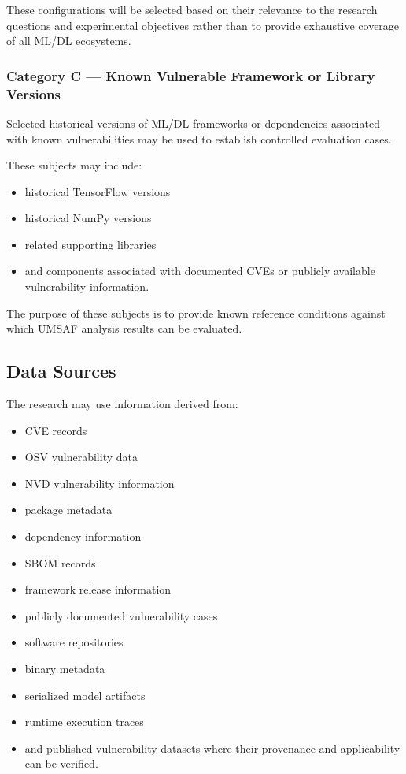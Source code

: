 \documentclass[
  12pt,
  letterpaper,
  oneside]{report}
\providecommand{\tightlist}{%
  \setlength{\itemsep}{0pt}\setlength{\parskip}{0pt}}
\begin{document}
These configurations will be selected based on their relevance to the
research questions and experimental objectives rather than to provide
exhaustive coverage of all ML/DL ecosystems.

\subsubsection{Category C --- Known Vulnerable Framework or Library
Versions}\label{category-c--known-vulnerable-framework-or-library-versions}

Selected historical versions of ML/DL frameworks or dependencies
associated with known vulnerabilities may be used to establish
controlled evaluation cases.

These subjects may include:

\begin{itemize}
\tightlist
\item
  historical TensorFlow versions
\item
  historical NumPy versions
\item
  related supporting libraries
\item
  and components associated with documented CVEs or publicly available
  vulnerability information.
\end{itemize}

The purpose of these subjects is to provide known reference conditions
against which UMSAF analysis results can be evaluated.

\subsection{Data Sources}\label{1132-data-sources}

The research may use information derived from:

\begin{itemize}
\tightlist
\item
  CVE records
\item
  OSV vulnerability data
\item
  NVD vulnerability information
\item
  package metadata
\item
  dependency information
\item
  SBOM records
\item
  framework release information
\item
  publicly documented vulnerability cases
\item
  software repositories
\item
  binary metadata
\item
  serialized model artifacts
\item
  runtime execution traces
\item
  and published vulnerability datasets where their provenance and
  applicability can be verified.
\end{itemize}
\end{document}
